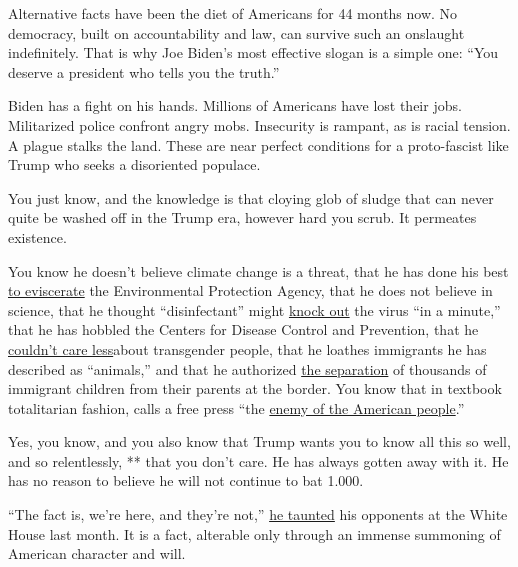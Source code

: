 Alternative facts have been the diet of Americans for 44 months now. No
democracy, built on accountability and law, can survive such an
onslaught indefinitely. That is why Joe Biden's most effective slogan is
a simple one: ``You deserve a president who tells you the truth.''

Biden has a fight on his hands. Millions of Americans have lost their
jobs. Militarized police confront angry mobs. Insecurity is rampant, as
is racial tension. A plague stalks the land. These are near perfect
conditions for a proto-fascist like Trump who seeks a disoriented
populace.

You just know, and the knowledge is that cloying glob of sludge that can
never quite be washed off in the Trump era, however hard you scrub. It
permeates existence.

You know he doesn't believe climate change is a threat, that he has done
his best
\href{https://www.pbs.org/wgbh/frontline/article/trump-administration-environmental-rollbacks-epa-coronavirus/}{to
eviscerate} the Environmental Protection Agency, that he does not
believe in science, that he thought ``disinfectant'' might
\href{https://www.youtube.com/watch?v=vfLZOkn0chc}{knock out} the virus
``in a minute,'' that he has hobbled the Centers for Disease Control and
Prevention, that he
\href{https://transequality.org/the-discrimination-administration}{couldn't
care less}about transgender people, that he loathes immigrants he has
described as ``animals,'' and that he authorized
\href{https://www.nytimes3xbfgragh.onion/2019/06/14/the-weekly/trump-immigration-border-separation-family.html}{the
separation} of thousands of immigrant children from their parents at the
border. You know that in textbook totalitarian fashion, calls a free
press ``the
\href{https://www.theguardian.com/us-news/2019/sep/07/donald-trump-war-on-the-media-oppo-research}{enemy
of the American people}.''

Yes, you know, and you also know that Trump wants you to know all this
so well, and so relentlessly, ** that you don't care. He has always
gotten away with it. He has no reason to believe he will not continue to
bat 1.000.

``The fact is, we're here, and they're not,''
\href{https://www.google.com/url?q=https://www.youtube.com/watch?v\%3DMevLAJjmhIk\&sa=D\&ust=1599842045176000\&usg=AFQjCNF2cwD4C8GClxHCHqhBtBoTu_iNPg}{he
taunted} his opponents at the White House last month. It is a fact,
alterable only through an immense summoning of American character and
will.

